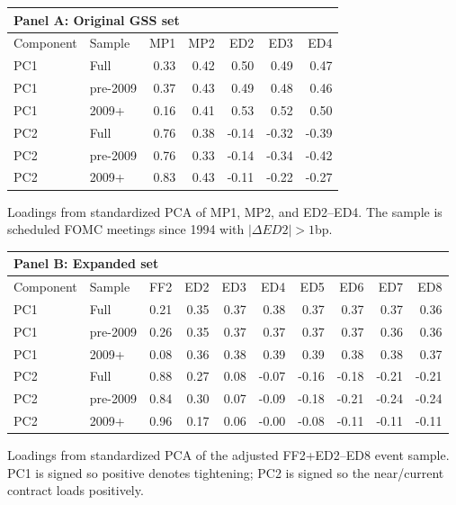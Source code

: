 \begin{tabular}{@{}llrrrrr@{}}
\toprule
\multicolumn{7}{l}{Panel A: Original GSS set} \\
\midrule
Component & Sample & MP1 & MP2 & ED2 & ED3 & ED4 \\
\midrule
PC1 & Full & 0.33 & 0.42 & 0.50 & 0.49 & 0.47 \\
PC1 & pre-2009 & 0.37 & 0.43 & 0.49 & 0.48 & 0.46 \\
PC1 & 2009+ & 0.16 & 0.41 & 0.53 & 0.52 & 0.50 \\
\addlinespace
PC2 & Full & 0.76 & 0.38 & -0.14 & -0.32 & -0.39 \\
PC2 & pre-2009 & 0.76 & 0.33 & -0.14 & -0.34 & -0.42 \\
PC2 & 2009+ & 0.83 & 0.43 & -0.11 & -0.22 & -0.27 \\
\bottomrule
\end{tabular}

\smallskip
\begin{minipage}{0.82\linewidth}\footnotesize Loadings from standardized PCA of MP1, MP2, and ED2--ED4. The sample is scheduled FOMC meetings since 1994 with $|\Delta ED2|>1$bp.\end{minipage}

\medskip

\begin{tabular}{@{}llrrrrrrrr@{}}
\toprule
\multicolumn{10}{l}{Panel B: Expanded set} \\
\midrule
Component & Sample & FF2 & ED2 & ED3 & ED4 & ED5 & ED6 & ED7 & ED8 \\
\midrule
PC1 & Full & 0.21 & 0.35 & 0.37 & 0.38 & 0.37 & 0.37 & 0.37 & 0.36 \\
PC1 & pre-2009 & 0.26 & 0.35 & 0.37 & 0.37 & 0.37 & 0.37 & 0.36 & 0.36 \\
PC1 & 2009+ & 0.08 & 0.36 & 0.38 & 0.39 & 0.39 & 0.38 & 0.38 & 0.37 \\
\addlinespace
PC2 & Full & 0.88 & 0.27 & 0.08 & -0.07 & -0.16 & -0.18 & -0.21 & -0.21 \\
PC2 & pre-2009 & 0.84 & 0.30 & 0.07 & -0.09 & -0.18 & -0.21 & -0.24 & -0.24 \\
PC2 & 2009+ & 0.96 & 0.17 & 0.06 & -0.00 & -0.08 & -0.11 & -0.11 & -0.11 \\
\bottomrule
\end{tabular}

\smallskip
\begin{minipage}{0.82\linewidth}\footnotesize Loadings from standardized PCA of the adjusted FF2+ED2--ED8 event sample. PC1 is signed so positive denotes tightening; PC2 is signed so the near/current contract loads positively.\end{minipage}
